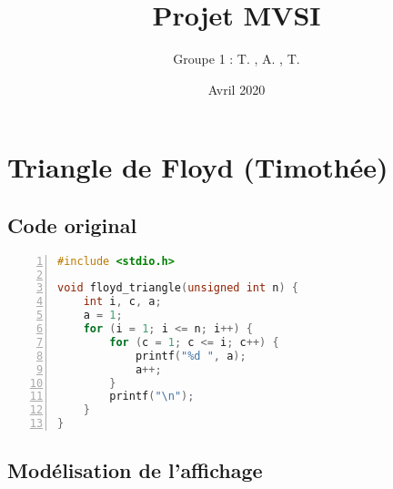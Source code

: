 \documentclass[a4paper, 11pt]{article}
\title{Projet MVSI}
\author{Groupe 1 : T. \sc{Adam}, A. \sc{Cesari}, T. \sc{Bagrel}}
\date{Avril 2020}
\theoremstyle{mystyle}
\begin{document}
\maketitle

\tableofcontents{}

\clearpage\section{Triangle de Floyd (Timothée)}

\subsection{Code original}

\begin{lstlisting}[language=c,  basicstyle=\ttfamily\normalsize\color{black!90},
  stringstyle=\color{black!70},
  commentstyle=\itshape\color{black!60},
  identifierstyle=\color{black!90},
  keywordstyle=\color{black!100}\bfseries,
  numberstyle=\ttfamily\small\color{black!50},
  numbers=left,
  numbersep=10pt,
  backgroundcolor=\color{black!1},
  rulecolor=\color{black!30},
  title=\large\ttfamily\lstname,
  breakatwhitespace=true,
  breaklines=false,
  captionpos=b,
  frame=single,
  keepspaces=true,
  showspaces=false,
  showstringspaces=false,
  showtabs=false,
  stepnumber=1,
  tabsize=4,
  numberblanklines=true,
  frameround=tttt,
  belowskip=-1.2\baselineskip,]
#include <stdio.h>

void floyd_triangle(unsigned int n) {
    int i, c, a;
    a = 1;
    for (i = 1; i <= n; i++) {
        for (c = 1; c <= i; c++) {
            printf("%d ", a);
            a++;
        }
        printf("\n");
    }
}

\end{lstlisting}

\subsection{Modélisation de l'affichage}
\end{document}
